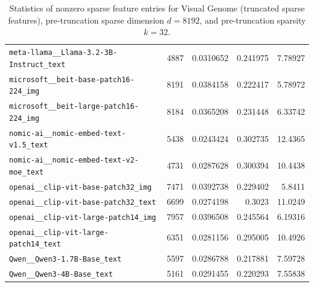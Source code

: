 \begin{table}[htbp]
{\begin{tabular}{lrrrr}
\texttt{meta-llama\_\_Llama-3.2-3B-Instruct\_text} & 4887 & 0.0310652 & 0.241975 & 7.78927 \\
\texttt{microsoft\_\_beit-base-patch16-224\_img} & 8191 & 0.0384158 & 0.222417 & 5.78972 \\
\texttt{microsoft\_\_beit-large-patch16-224\_img} & 8184 & 0.0365208 & 0.231448 & 6.33742 \\
\texttt{nomic-ai\_\_nomic-embed-text-v1.5\_text} & 5438 & 0.0243424 & 0.302735 & 12.4365 \\
\texttt{nomic-ai\_\_nomic-embed-text-v2-moe\_text} & 4731 & 0.0287628 & 0.300394 & 10.4438 \\
\texttt{openai\_\_clip-vit-base-patch32\_img} & 7471 & 0.0392738 & 0.229402 & 5.8411 \\
\texttt{openai\_\_clip-vit-base-patch32\_text} & 6699 & 0.0274198 & 0.3023 & 11.0249 \\
\texttt{openai\_\_clip-vit-large-patch14\_img} & 7957 & 0.0396508 & 0.245564 & 6.19316 \\
\texttt{openai\_\_clip-vit-large-patch14\_text} & 6351 & 0.0281156 & 0.295005 & 10.4926 \\
\texttt{Qwen\_\_Qwen3-1.7B-Base\_text} & 5597 & 0.0286788 & 0.217881 & 7.59728 \\
\texttt{Qwen\_\_Qwen3-4B-Base\_text} & 5161 & 0.0291455 & 0.220293 & 7.55838 \\
\bottomrule
\end{tabular}
}%
\caption{Statistics of nonzero sparse feature entries for Visual Genome (truncated sparse features), pre-truncation sparse dimension $d=8192$, and pre-truncation sparsity $k=32$.}
\label{tab:sparse-feature-entries-visual-genome-truncated-d8192-k32}
\end{table}
